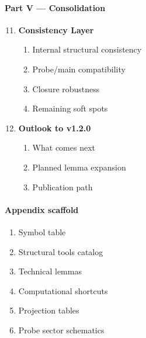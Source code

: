 \paragraph{Part V --- Consolidation}
\begin{enumerate}[leftmargin=2em,label=\arabic*.]
  \setcounter{enumi}{10}
  \item \textbf{Consistency Layer}
    \begin{enumerate}[label*=\arabic*., leftmargin=2.5em]
      \item Internal structural consistency
      \item Probe/main compatibility
      \item Closure robustness
      \item Remaining soft spots
    \end{enumerate}
  \item \textbf{Outlook to v1.2.0}
    \begin{enumerate}[label*=\arabic*., leftmargin=2.5em]
      \item What comes next
      \item Planned lemma expansion
      \item Publication path
    \end{enumerate}
\end{enumerate}

\paragraph{Appendix scaffold}
\begin{enumerate}[leftmargin=2em,label=\Alph*.]
  \item Symbol table
  \item Structural tools catalog
  \item Technical lemmas
  \item Computational shortcuts
  \item Projection tables
  \item Probe sector schematics
\end{enumerate}

